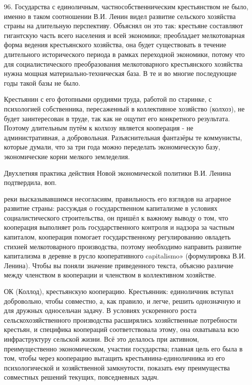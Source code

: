\label{096-1}
96. Государства с единоличным, частнособственническим крестьянством не было, именно в таком соотношении В.И. Ленин видел развитие сельского хозяйства страны на длительную перспективу. Объяснял он это так: крестьяне составляют гигантскую часть всего населения и всей экономики; преобладает мелкотоварная форма ведения крестьянского хозяйства, она будет существовать в течение длительного исторического периода в рамках переходной экономики, потому что для социалистического преобразования мелкотоварного крестьянского хозяйства нужна мощная материально-техническая база. В те и во многие последующие годы такой базы не было.

\label{097-1}
Крестьянин с его фотопными орудиями труда, работой по старинке, с психологией собственника, пересаженный в коллективное хозяйство (колхоз), не будет заинтересован в труде, так как не ощутит его конкретного результата. Поэтому длительным путём к колхозу является кооперация - не административная, а добровольная. Разъяснительная фантазёры те коммунисты, которые думали, что за три года можно переделать экономическую базу, экономические корни мелкого земледелия.

Двухлетняя практика действия Новой экономической политики В.И. Ленина подтвердила, воп.

\label{098-1}
реки высказывавшимся несогласиям, правильность его взглядов на аграрное развитие страны: рассуждая о государственном капитализме в условиях социалистического строительства, он пришёл к важному выводу о том, что кооперация выполняет роль государственного контроля и надзора за частным капиталом, кооперация помогает государственному регулированию овладеть стихией мелкотоварного производства, поэтому необходимо направить развитие капитализма в деревне в русло кооперативного capitalismo» (формулировка В.И. Ленина). Чтобы вы поняли значение приведенного текста, объясню различие между членством в кооперации и членством в коллективном хозяйстве.

\label{099-1}
ОК (Коллод), крестьянскую кооперацию. Крестьянник: единоличник вступал добровольно, чтобы совместно, а, как правило, и легче, решить однозначную и для дружных односельчан задачу. В условиях ускоренного роста сельскохозяйственного производства расширялись хозяйственные потребности крестьян, и специфика коопераций соответствовала этому, она охватывала всю инфраструктуру сельской жизни. Всё это делалось при активном, преимущественно экономическом, участии государства; главная цель его была в том, чтобы через кооперацию вытащить крестьянина-единоличника из его психологической и хозяйственной замкнутости, показать ему преимущества совместных решений текущих, повседневных задач.

